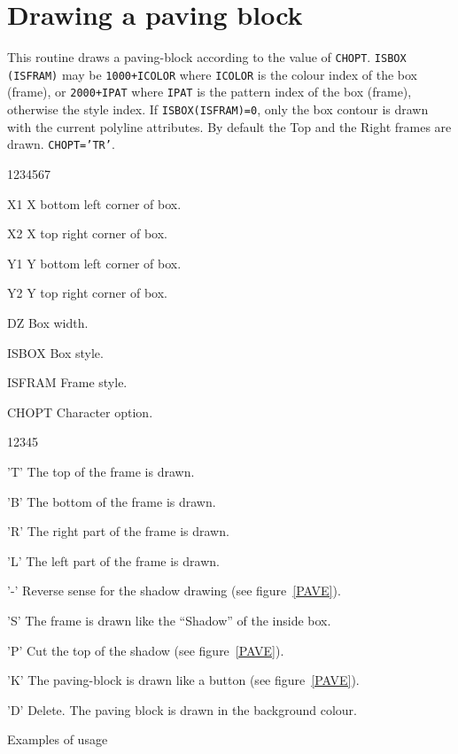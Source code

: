 \vfill\newpage
{}
\section{Drawing a paving block}
\Action
 This routine draws a paving-block according to the value of {\tt CHOPT}.
 {\tt ISBOX (ISFRAM)} may be {\tt 1000+ICOLOR} where {\tt ICOLOR} is the
colour index of the box (frame), or {\tt 2000+IPAT} where {\tt IPAT} is
the pattern index of the box (frame), otherwise the style index.
If {\tt ISBOX(ISFRAM)=0}, only the box contour is drawn with the current
polyline attributes. By default the Top and the Right frames are drawn.
{\tt CHOPT='TR'}.
\Pdesc
\begin{DLtt}{1234567}
\item[X1]     X bottom left corner of box.
\item[X2]     X top right corner of box.
\item[Y1]     Y bottom left corner of box.
\item[Y2]     Y top right corner of box.
\item[DZ]     Box width.
\item[ISBOX]  Box style.
\item[ISFRAM] Frame style.
\item[CHOPT]  Character option.
\begin{DLtt}{12345}
   \item['T'] The top of the frame is drawn.
   \item['B'] The bottom of the frame is drawn.
   \item['R'] The right part of the frame is drawn.
   \item['L'] The left part of the frame is drawn.
   \item['-'] Reverse sense for the shadow drawing (see figure~\ref{PAVE}).
   \item['S'] The frame is drawn like the ``Shadow'' of the inside box.
   \item['P'] Cut the top of the shadow (see figure~\ref{PAVE}).
   \item['K'] The paving-block is drawn like a button (see figure~\ref{PAVE}).
   \item['D'] Delete. The paving block is drawn in the background colour.
\end{DLtt}
\end{DLtt}
\newpage

\begin{Fighere}
\begin{center}\mbox{}\end{center}
\caption{Examples of \protect{} usage}
\label{PAVE}
\end{Fighere}
 
